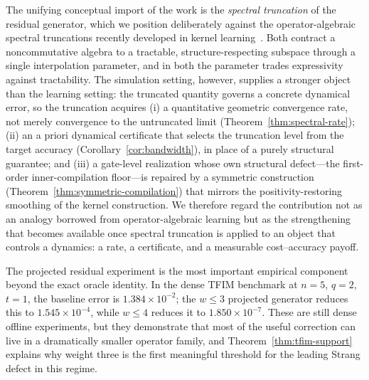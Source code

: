\documentclass[aps,prxquantum,reprint,superscriptaddress,nofootinbib,amsmath,amssymb]{revtex4-2}
\newcommand{\tfim}{TFIM}
\begin{document}
The unifying conceptual import of the work is the \emph{spectral truncation} of the residual generator, which we position deliberately against the operator-algebraic spectral truncations recently developed in kernel learning~\cite{hashimoto2024spectral,hashimoto2023rkhm}. Both contract a noncommutative algebra to a tractable, structure-respecting subspace through a single interpolation parameter, and in both the parameter trades expressivity against tractability. The simulation setting, however, supplies a stronger object than the learning setting: the truncated quantity governs a concrete dynamical error, so the truncation acquires (i) a quantitative geometric convergence rate, not merely convergence to the untruncated limit (Theorem~\ref{thm:spectral-rate}); (ii) an a priori dynamical certificate that selects the truncation level from the target accuracy (Corollary~\ref{cor:bandwidth}), in place of a purely structural guarantee; and (iii) a gate-level realization whose own structural defect---the first-order inner-compilation floor---is repaired by a symmetric construction (Theorem~\ref{thm:symmetric-compilation}) that mirrors the positivity-restoring smoothing of the kernel construction. We therefore regard the contribution not as an analogy borrowed from operator-algebraic learning but as the strengthening that becomes available once spectral truncation is applied to an object that controls a dynamics: a rate, a certificate, and a measurable cost--accuracy payoff.

The projected residual experiment is the most important empirical component beyond the exact oracle identity. In the dense \tfim{} benchmark at $n=5$, $q=2$, $t=1$, the baseline error is $1.384\times10^{-2}$; the $w\leq3$ projected generator reduces this to $1.545\times10^{-4}$, while $w\leq4$ reduces it to $1.850\times10^{-7}$. These are still dense offline experiments, but they demonstrate that most of the useful correction can live in a dramatically smaller operator family, and Theorem~\ref{thm:tfim-support} explains why weight three is the first meaningful threshold for the leading Strang defect in this regime.
\end{document}
